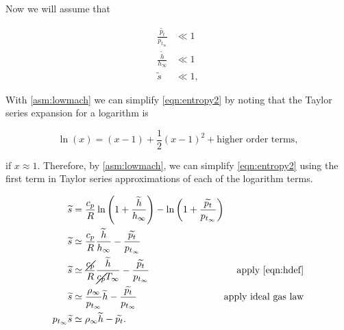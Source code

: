 

Now we will assume that

\begin{assumption}
    \label{asm:lowmach}


    \begin{align}
        \frac{\widetilde{p_t}}{p_{t_\infty}}  &\ll  1 \\
        \frac{\widetilde{h}}{h_\infty} &\ll  1 \\
        \widetilde{s} &\ll  1,
    \end{align}



\end{assumption}

\noindent With \cref{asm:lowmach} we can simplify \cref{eqn:entropy2} by noting that the Taylor series expansion for a logarithm is

\begin{equation}
    \ln(x) = (x-1) + \frac{1}{2}(x-1)^2 + \text{higher order terms},
\end{equation}

\noindent if \(x\approx1\).
%
Therefore, by \cref{asm:lowmach}, we can simplify \cref{eqn:entropy2} using the first term in Taylor series approximations of each of the logarithm terms.

\begin{equation}
    \begin{alignedat}{2}
        \widetilde{s} &= \frac{c_p}{R} \ln \left( 1 + \frac{ \widetilde{h} }{ h_\infty} \right) - \ln\left( 1+\frac{ \widetilde{p_t} }{ p_{t_\infty } }\right) \\
        \widetilde{s} &\simeq \frac{c_p}{R} \frac{ \widetilde{h} }{ h_\infty} - \frac{ \widetilde{p_t} }{ p_{t_\infty} } \\
        \widetilde{s} &\simeq \frac{\cancel{c_p}}{R} \frac{ \widetilde{h} }{ \cancel{c_p}T_\infty} - \frac{ \widetilde{p_t} }{ p_{t_\infty} } & \text{apply \cref{eqn:hdef}}\\
        \widetilde{s} &\simeq \frac{\rho_\infty}{p_{t_\infty}}  \widetilde{h}  - \frac{ \widetilde{p_t} }{ p_{t_\infty} } & \text{apply ideal gas law} \\
        p_{t_\infty} \widetilde{s} &\simeq \rho_\infty \widetilde{h}  -  \widetilde{p_t}.
    \end{alignedat}
\end{equation}

